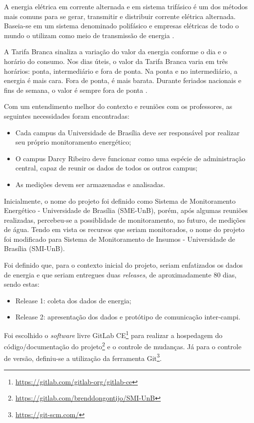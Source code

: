 A energia elétrica em corrente alternada e em sistema trifásico é um dos métodos mais comuns para se gerar, transmitir e distribuir corrente elétrica alternada. Baseia-se em um sistema denominado polifásico e empresas elétricas de todo o mundo o utilizam como meio de transmissão de energia \cite{stevenson_1962}.

A Tarifa Branca sinaliza a variação do valor da energia conforme o dia e o horário do consumo. Nos dias úteis, o valor da Tarifa Branca varia em três horários: ponta, intermediário e fora de ponta. Na ponta e no intermediário, a energia é mais cara. Fora de ponta, é mais barata. Durante feriados nacionais e fins de semana, o valor é sempre fora de ponta \cite{aneel}.

Com um entendimento melhor do contexto e reuniões com os professores, as seguintes necessidades foram encontradas:

\begin{itemize}
    \item Cada campus da Universidade de Brasília deve ser responsável por realizar seu próprio monitoramento energético;
    \item O campus Darcy Ribeiro deve funcionar como uma espécie de administração central, capaz de reunir os dados de todos os outros campus;
    \item As medições devem ser armazenadas e analisadas.
\end{itemize}

Inicialmente, o nome do projeto foi definido como Sistema de Monitoramento Energético - Universidade de Brasília (SME-UnB), porém, após algumas reuniões realizadas, percebeu-se a possiblidade de monitoramento, no futuro, de medições de água. Tendo em vista os recursos que seriam monitorados, o nome do projeto foi modificado para Sistema de Monitoramento de Insumos - Universidade de Brasília (SMI-UnB).

Foi definido que, para o contexto inicial do projeto, seriam enfatizados os dados de energia e que seriam entregues duas \textit{releases}, de aproximadamente 80 dias, sendo estas:

\begin{itemize}
    \item Release 1: coleta dos dados de energia;
    \item Release 2: apresentação dos dados e protótipo de comunicação inter-campi.
\end{itemize}

Foi escolhido o \textit{software} livre GitLab CE\footnote{\url{https://gitlab.com/gitlab-org/gitlab-ce}} para realizar a hospedagem do código/documentação do projeto\footnote{\url{https://gitlab.com/brenddongontijo/SMI-UnB}} e o controle de mudanças. Já para o controle de versão, definiu-se a utilização da ferramenta Git\footnote{\url{https://git-scm.com/}}.

